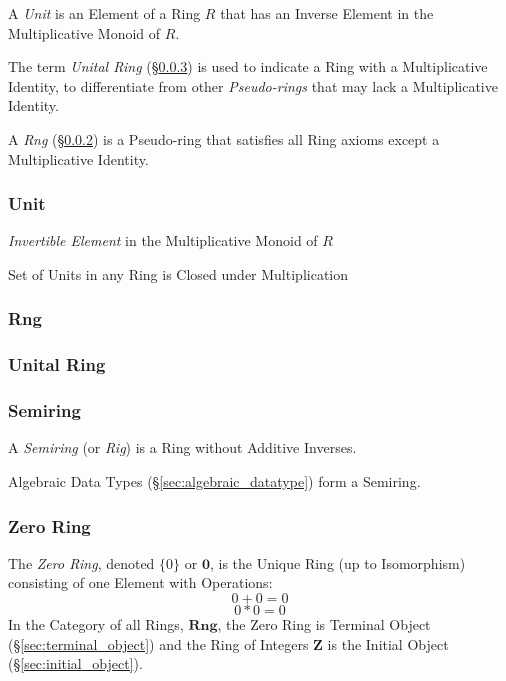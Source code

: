 A \emph{Unit} is an Element of a Ring $R$ that has an Inverse
Element in the Multiplicative Monoid of $R$.

The term \emph{Unital Ring} (\S\ref{sec:unital_ring}) is used to
indicate a Ring with a Multiplicative Identity, to differentiate from
other \emph{Pseudo-rings} that may lack a Multiplicative Identity.

A \emph{Rng} (\S\ref{sec:rng}) is a Pseudo-ring that satisfies all
Ring axioms except a Multiplicative Identity.



\subsubsection{Unit}\label{sec:ring_unit}

\emph{Invertible Element} in the Multiplicative Monoid of $R$

Set of Units in any Ring is Closed under Multiplication



\subsubsection{Rng}\label{sec:rng}

\subsubsection{Unital Ring}\label{sec:unital_ring}

\subsubsection{Semiring}\label{sec:semiring}

A \emph{Semiring} (or \emph{Rig}) is a Ring without Additive Inverses.

Algebraic Data Types (\S\ref{sec:algebraic_datatype}) form a Semiring.



\subsubsection{Zero Ring}\label{sec:zero_ring}

The \emph{Zero Ring}, denoted $\{0\}$ or $\mathbf{0}$, is the Unique Ring
(up to Isomorphism) consisting of one Element with Operations:
\[
    0 + 0 = 0
\] \[
    0 * 0 = 0
\]
In the Category of all Rings, $\mathbf{Rng}$, the Zero Ring is
Terminal Object (\S\ref{sec:terminal_object}) and the Ring of Integers
$\mathbf{Z}$ is the Initial Object (\S\ref{sec:initial_object}).



